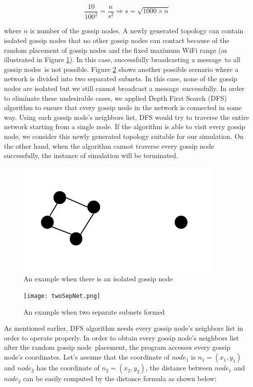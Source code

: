 \documentclass[onehalf,11pt]{beavtex}
\newcommand{\msg}{message}
\newcommand{\gn}{gossip node}
\newcommand{\gns}{gossip nodes}
\begin{document}
\[ \frac{10}{100^2}=\frac{n}{s^2} \Longrightarrow s=\sqrt{1000\times n} \]

where $n$ is number of the gossip nodes. A newly generated topology can contain isolated gossip nodes that no other gossip nodes can contact because of the random placement of gossip nodes and the fixed maximum WiFi range (as illustrated in Figure \ref{fig:isolate}). In this case, successfully broadcasting a \msg ~to all \gns ~is not possible. Figure \ref{fig:twoSepNet} shows another possible scenario where a network is divided into two separated subnets. In this case, none of the gossip nodes are isolated but we still cannot broadcast a \msg ~successfully. In order to eliminate these undesirable cases, we applied Depth First Search (DFS) algorithm to ensure that every gossip node in the network is connected in some way. Using each gossip node's neighbors list, DFS would try to traverse the entire network starting from a single node. If the algorithm is able to visit every gossip node, we consider this newly generated topology suitable for our simulation. On the other hand, when the algorithm cannot traverse every gossip node successfully, the instance of simulation will be terminated.

\begin{figure}
	\centering
	\includegraphics[width=4in]{isolate.png}
	\caption{An example when there is an isolated gossip node}
	\label{fig:isolate}
\end{figure}

\begin{figure}
	\centering
	\texttt{[image: twoSepNet.png]}
	\caption{An example when two separate subnets formed}
	\label{fig:twoSepNet}
\end{figure}

As mentioned earlier, DFS algorithm needs every \gn's neighbors list in order to operate properly. In order to obtain every \gn's neighbors list after the random \gn ~placement, the program accesses every \gn's coordinates. Let's assume that the coordinate of $node_1$ is $n_1=(x_1, y_1)$ and $node_2$ has the coordinate of $n_2=(x_2, y_2)$, the distance between $node_1$ and $node_2$ can be easily computed by the distance formula as shown below:
\end{document}
